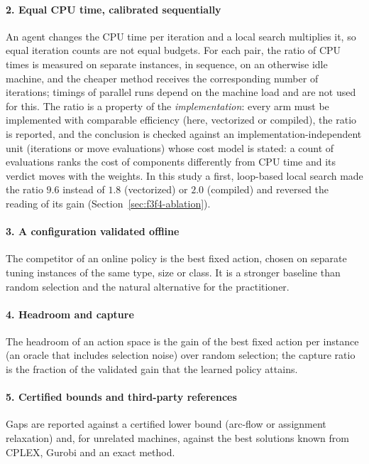 \paragraph{2. Equal CPU time, calibrated sequentially}
An agent changes the CPU time per iteration and a local search multiplies it, so equal iteration counts are not equal budgets. For each pair, the ratio of CPU times is measured on separate
instances, in sequence, on an otherwise idle machine, and the cheaper method receives the corresponding number of iterations; timings of parallel runs depend on the machine load and are not used
for this. The ratio is a property of the \emph{implementation}: every arm must be implemented with comparable efficiency (here, vectorized or compiled), the ratio is reported, and the conclusion is checked against an implementation-independent unit (iterations or move evaluations) whose cost model is stated:
a count of evaluations ranks the cost of components differently from CPU time and its verdict moves with the weights. In this study a first, loop-based local search made the ratio $9.6$ instead of $1.8$ (vectorized) or $2.0$ (compiled) and reversed the reading of its gain (Section~\ref{sec:f3f4-ablation}).

\paragraph{3. A configuration validated offline}
The competitor of an online policy is the best fixed action, chosen on separate tuning instances of the same type, size or class. It is a stronger baseline than random selection and the
natural alternative for the practitioner.

\paragraph{4. Headroom and capture}
The headroom of an action space is the gain of the best fixed action per instance (an oracle that includes selection noise) over random selection; the capture ratio is the fraction of the
validated gain that the learned policy attains.

\paragraph{5. Certified bounds and third-party references}
Gaps are reported against a certified lower bound (arc-flow or assignment relaxation) and, for unrelated machines, against the best solutions known from CPLEX, Gurobi and an exact method.

